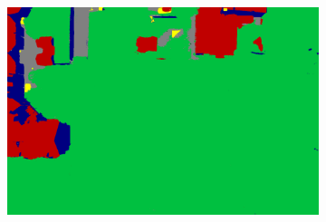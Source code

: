 \begin{figure}[htb]
\begin{subfigure}{0.243\columnwidth}
\end{subfigure}
\begin{subfigure}{0.243\columnwidth}
  \centering
  \includegraphics[width=1\linewidth]{fig/segmentation/DSC00792_6000_autocrf.png}
\end{subfigure}



\end{figure}
